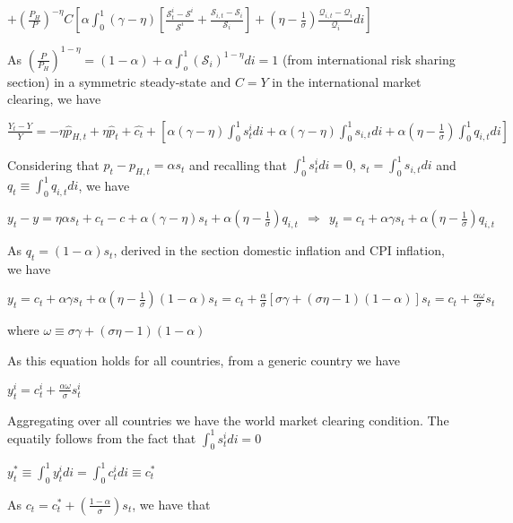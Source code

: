 \documentclass[
]{article}
\begin{document}
\(\displaystyle +\left( \frac{P_H}{P} \right)^{-\eta} C \left[\alpha \int_0^1 (\gamma-\eta) \left[ \frac{ \mathcal{S}_{t}^i-\mathcal{S}^i }{\mathcal{S}^i} + \frac{ \mathcal{S}_{i,t}-\mathcal{S}_i }{\mathcal{S}_i}\right] + \left(\eta-\frac{1}{\sigma} \right) \frac{\mathcal{Q}_{i,t}-\mathcal{Q}_i}{\mathcal{Q}_i} di \right]\)

As
\(\displaystyle \left( \frac{P}{P_H} \right)^{1-\eta}=(1-\alpha)+\alpha \int_o^1(\mathcal{S}_i)^{1-\eta}di =1\)
(from international risk sharing section) in a symmetric steady-state
and \(C=Y\) in the international market clearing, we have

\(\displaystyle \frac{Y_t-Y}{Y} = -\eta \hat{p}_{H,t} +\eta \hat{p}_t + \hat{c_t} + \left[\alpha (\gamma-\eta) \int_0^1 s_t^i di + \alpha (\gamma-\eta) \int_0^1 s_{i,t}di + \alpha\left(\eta-\frac{1}{\sigma} \right) \int_0^1 q_{i,t} di \right]\)

Considering that \(p_t-p_{H,t}=\alpha s_t\) and recalling that
\(\displaystyle \int_0^1s_t^idi=0\),
\(\displaystyle s_t= \int_0^1s_{i,t}di\) and
\(\displaystyle q_t \equiv \int_0^1 q_{i,t}di\), we have

\(\displaystyle y_t-y = \eta \alpha s_t +c_t-c + \alpha (\gamma-\eta) s_t + \alpha\left(\eta-\frac{1}{\sigma} \right) q_{i,t} \ \ \Rightarrow \ \ y_t=c_t+ \alpha \gamma s_t + \alpha\left(\eta-\frac{1}{\sigma} \right) q_{i,t}\)

As \(q_t = (1-\alpha)s_t\), derived in the section domestic inflation
and CPI inflation, we have

\(\displaystyle y_t=c_t+ \alpha \gamma s_t + \alpha\left(\eta-\frac{1}{\sigma} \right) (1-\alpha)s_t=c_t+\frac{\alpha}{\sigma}\left[ \sigma \gamma + (\sigma \eta - 1)(1-\alpha) \right] s_t = c_t+\frac{\alpha \omega}{\sigma}s_t\)

where \(\omega \equiv \sigma \gamma + (\sigma \eta - 1)(1-\alpha)\)

As this equation holds for all countries, from a generic country we have

\(\displaystyle y_t^i=c_t^i+ \frac{\alpha \omega}{\sigma} s_t^i\)

Aggregating over all countries we have the world market clearing
condition. The equatily follows from the fact that
\(\int_0^1 s_t^i di =0\)

\(y_t^* \equiv \int_0^1y_t^idi = \int_0^1c_t^idi \equiv c_t^*\)

As
\(\displaystyle c_t = c_t^* + \left(\frac{1-\alpha}{\sigma} \right)s_t\),
we have that
\end{document}

